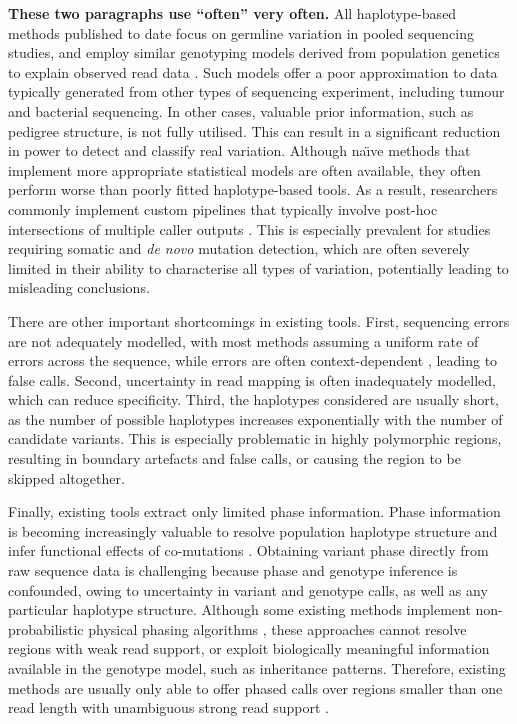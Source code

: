 \documentclass[notitlepage, twocolumn]{article}
\begin{document}
{\bf These two paragraphs use ``often'' very often.}
All haplotype-based methods published to date focus on germline variation in pooled sequencing studies, and employ similar genotyping models derived from population genetics to explain observed read data \cite{RN141, RN538, RN5}. Such models offer a poor approximation to data typically generated from other types of sequencing experiment, including tumour and bacterial sequencing. In other cases, valuable prior information, such as pedigree structure, is not fully utilised. This can result in a significant reduction in power to detect and classify real variation. Although na\"\i ve methods that implement more appropriate statistical models are often available, they often perform worse than poorly fitted haplotype-based tools.
As a result, researchers commonly implement custom pipelines that typically involve post-hoc intersections of multiple caller outputs \cite{RN156, RN361, RN373, RN276, RN3, RN514, RN541, RN540}. This is especially prevalent for studies requiring somatic and \textit{de novo} mutation detection, which are often severely limited in their ability to characterise all types of variation, potentially leading to misleading conclusions.

There are other important shortcomings in existing tools.
First, sequencing errors are not adequately modelled, with most methods \cite{RN538, RN141} assuming a uniform rate of errors across the sequence, while errors are often context-dependent \cite{RN149}, leading to false calls.
Second, uncertainty in read mapping \cite{RN138} is often inadequately modelled, which can reduce specificity.
Third, the haplotypes considered are usually short, as the number of possible haplotypes increases exponentially with the number of candidate variants. This is especially problematic in highly polymorphic regions, resulting in boundary artefacts and false calls, or causing the region to be skipped altogether.

Finally, existing tools extract only limited phase information.
Phase information is becoming increasingly valuable to resolve population haplotype structure and infer functional effects of co-mutations \cite{RN211}.
Obtaining variant phase directly from raw sequence data is challenging because phase and genotype inference is confounded, owing to uncertainty in variant and genotype calls, as well as any particular haplotype structure.
Although some existing methods implement non-probabilistic physical phasing algorithms \cite{RN538}, these approaches cannot resolve regions with weak read support, or exploit biologically meaningful information available in the genotype model, such as inheritance patterns. Therefore, existing methods are usually only able to offer phased calls over regions smaller than one read length with unambiguous strong read support \cite{RN538}.
\end{document}
